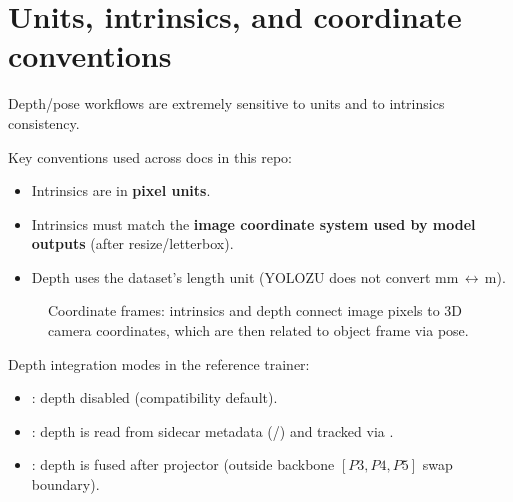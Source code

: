 \section{Units, intrinsics, and coordinate conventions}
Depth/pose workflows are extremely sensitive to units and to intrinsics consistency.

Key conventions used across docs in this repo:
\begin{itemize}
  \item Intrinsics  are in \textbf{pixel units}.
  \item Intrinsics must match the \textbf{image coordinate system used by model outputs} (after resize/letterbox).
  \item Depth  uses the dataset's length unit (YOLOZU does not convert mm\,$\leftrightarrow$\,m).
\end{itemize}

\begin{figure}[h]
\centering
{}
\caption{Coordinate frames: intrinsics and depth connect image pixels to 3D camera coordinates, which are then related to object frame via pose.}
\end{figure}

Depth integration modes in the reference trainer:
\begin{itemize}
  \item {}: depth disabled (compatibility default).
  \item {}: depth is read from sidecar metadata (/) and tracked via .
  \item {}: depth is fused after projector (outside backbone \([P3,P4,P5]\) swap boundary).
\end{itemize}

